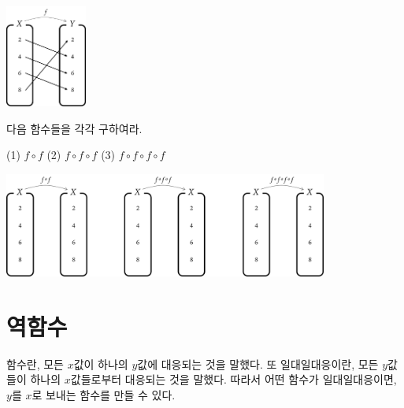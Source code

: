 \documentclass{oblivoir}
\begin{document}
%
\label{composition10}
\begin{center}
\includegraphics[width=0.2\textwidth]{composition_10-1}
\end{center}
\bigskip\bigskip
다음 함수들을 각각 구하여라.
\begin{flushleft}
\hspace{40pt}
(1) \(f\circ f\)
\hspace{50pt}
(2) \(f\circ f\circ f\)
\hspace{40pt}
(3) \(f\circ f\circ f\circ f\)
\end{flushleft}
\begin{center}
\includegraphics[width=0.8\textwidth]{composition_10-2}
\end{center}

\newpage
\section{역함수}
함수란, 모든 \(x\)값이 하나의 \(y\)값에 대응되는 것을 말했다.
또 일대일대응이란, 모든 \(y\)값들이 하나의 \(x\)값들로부터 대응되는 것을 말했다.
따라서 어떤 함수가 일대일대응이면, \(y\)를 \(x\)로 보내는 함수를 만들 수 있다.
\end{document}
